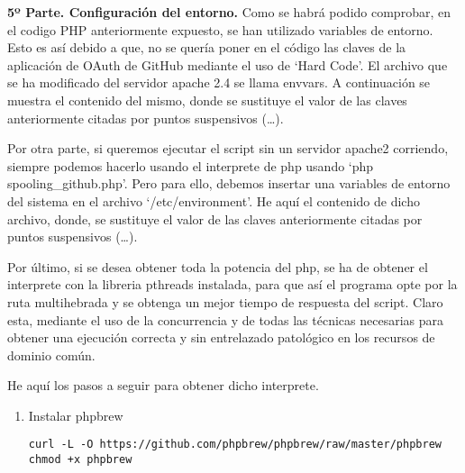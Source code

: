 \documentclass{article}
\begin{document}
\begin{enumerate}
\textbf{5º Parte. Configuración del entorno.}
Como se habrá podido comprobar, en el codigo PHP anteriormente expuesto, se
han utilizado variables de entorno. Esto es así debido a que, no se quería
poner en el código las claves de la aplicación de OAuth de GitHub mediante el
uso de `Hard Code'. El archivo que se ha modificado del servidor apache 2.4
se llama envvars. A continuación se muestra el contenido del mismo, donde
se sustituye el valor de las claves anteriormente citadas por puntos suspensivos
(\ldots).



Por otra parte, si queremos ejecutar el script sin un servidor apache2 corriendo, siempre podemos hacerlo
usando el interprete de php usando `php spooling\_github.php'. Pero para ello, debemos insertar
una variables de entorno del sistema en el archivo `/etc/environment'. He aquí el contenido de dicho
archivo, donde, se sustituye el valor de las claves anteriormente citadas por puntos suspensivos
(\ldots).



Por último, si se desea obtener toda la potencia del php, se ha de obtener el interprete
con la libreria pthreads instalada, para que así el programa opte por la ruta multihebrada
y se obtenga un mejor tiempo de respuesta del script. Claro esta, mediante el uso de la
concurrencia y de todas las técnicas necesarias para obtener una ejecución correcta y
sin entrelazado patológico en los recursos de dominio común.

He aquí los pasos a seguir para obtener dicho interprete.

\begin{enumerate}
    \item Instalar phpbrew
    \begin{lstlisting}[frame=single]
curl -L -O https://github.com/phpbrew/phpbrew/raw/master/phpbrew
chmod +x phpbrew


\end{lstlisting}
\end{enumerate}
\end{enumerate}
\end{document}

